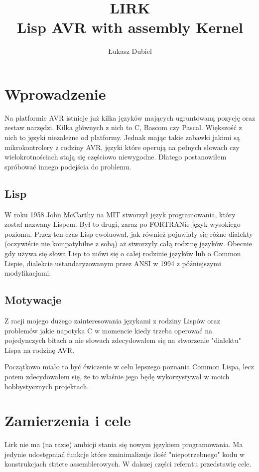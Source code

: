 \documentclass[11pt]{article}
\author{Łukasz Dubiel}
\title{LIRK \\ Lisp AVR with assembly Kernel}
\begin{document}
\maketitle

\section{Wprowadzenie}

Na platformie AVR istnieje już kilka języków mających ugruntowaną pozycję oraz zestaw narzędzi. Kilka głównych z nich to C, Bascom czy Pascal. Większość z nich to języki niezależne od platformy. Jednak mając takie zabawki jakimi są mikrokontrolery z rodziny AVR, języki które operują na pełnych słowach czy wielokrotnościach stają się częściowo niewygodne. Dlatego postanowiłem spróbować innego podejścia do problemu.

\subsection{Lisp}

W roku 1958 John McCarthy na MIT stworzył język programowania, który został nazwany Lispem. Był to drugi, zaraz po FORTRANie język wysokiego poziomu. Przez ten czas Lisp ewoluował, jak również pojawiały się różne dialekty (oczywiście nie kompatybilne z sobą) aż stworzyły całą rodzinę języków. Obecnie gdy używa się słowa Lisp to mówi się o całej rodzinie języków lub o Common Lispie, dialekcie ustandaryzowanym przez ANSI w 1994 z późniejszymi modyfikacjami.

\subsection{Motywacje}

Z racji mojego dużego zainteresowania językami z rodziny Lispów oraz problemów jakie napotyka C w momencie kiedy trzeba operować na pojedynczych bitach a nie słowach zdecydowałem się na stworzenie "dialektu" Lispa na rodzinę AVR. 

Początkowo miało to być ćwiczenie w celu lepszego poznania Common Lispa, lecz potem zdecydowałem się, że to właśnie jego będę wykorzystywał w moich hobbystycznych projektach.

\section{Zamierzenia i cele}
Lirk nie ma (na razie) ambicji stania się nowym językiem programowania. Ma jedynie udostępniać funkcje które zminimalizuje ilość "niepotrzebnego" kodu w konstrukcjach stricte assemblerowych. W dalszej części referatu przedstawię cele.
\end{document}
